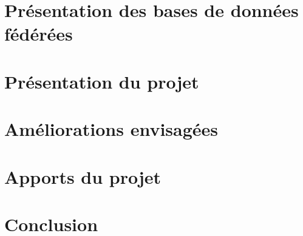 \documentclass[10pt,a4paper]{report}
\begin{document}
\chapter{Présentation des bases de données fédérées}


\chapter{Présentation du projet}


\chapter{Améliorations envisagées}


\chapter{Apports du projet}


\appendix





\chapter*{Conclusion}

\end{document}

